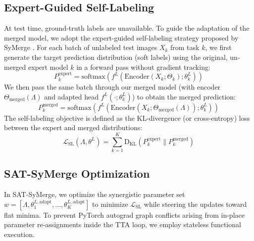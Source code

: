\documentclass{article}
\begin{document}
\subsection{Expert-Guided Self-Labeling}
At test time, ground-truth labels are unavailable. To guide the adaptation of the merged model, we adopt the expert-guided self-labeling strategy proposed by SyMerge \cite{jung2025symerge}. For each batch of unlabeled test images $X_k$ from task $k$, we first generate the target prediction distribution (soft labels) using the original, un-merged expert model $k$ in a forward pass without gradient tracking:
\begin{equation}
    P_k^{\text{expert}} = \text{softmax}(f^L(\text{Encoder}(X_k; \Theta_k); \theta_k^L))
\end{equation}
We then pass the same batch through our merged model (with encoder $\Theta_{\text{merged}}(\Lambda)$ and adapted head $f^L(\cdot; \theta_k^L)$) to obtain the merged prediction:
\begin{equation}
    P_k^{\text{merged}} = \text{softmax}(f^L(\text{Encoder}(X_k; \Theta_{\text{merged}}(\Lambda)); \theta_k^L))
\end{equation}
The self-labeling objective is defined as the KL-divergence (or cross-entropy) loss between the expert and merged distributions:
\begin{equation}
    \mathcal{L}_{\text{SL}}(\Lambda, \theta^L) = \sum_{k=1}^K \text{D}_{\text{KL}}\left( P_k^{\text{expert}} \parallel P_k^{\text{merged}} \right)
\end{equation}

\subsection{SAT-SyMerge Optimization}
In SAT-SyMerge, we optimize the synergistic parameter set $w = [\Lambda, \theta_1^{L,\text{adapt}}, \dots, \theta_K^{L,\text{adapt}}]$ to minimize $\mathcal{L}_{\text{SL}}$ while steering the updates toward flat minima. To prevent PyTorch autograd graph conflicts arising from in-place parameter re-assignments inside the TTA loop, we employ stateless functional execution.
\end{document}

